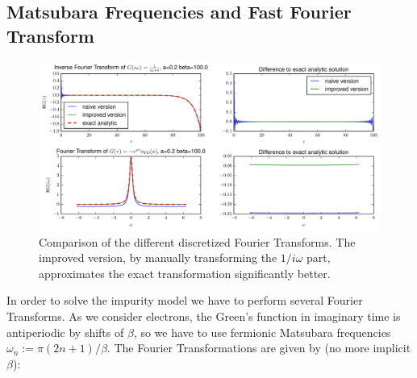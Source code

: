 \begin{appendix}
\section{Matsubara Frequencies and Fast Fourier Transform}
\begin{figure}[h]
	\centering
	\includegraphics[width=\textwidth]{Matsubara_Fourier_fig}
	\caption{Comparison of the different discretized Fourier Transforms. The improved version, by manually transforming the $1/i \omega$ part, approximates the exact transformation significantly better. }
	\label{fig:fourier_traf}
\end{figure}
In order to solve the impurity model we have to perform several Fourier Transforms.
As we consider electrons, the Green's function in imaginary time is antiperiodic by shifts of $\beta$, so we have to use fermionic Matsubara frequencies $ω_n:=π(2n+1)/β$.
The Fourier Transformations are given by (no more implicit $\beta$):


\end{appendix}
